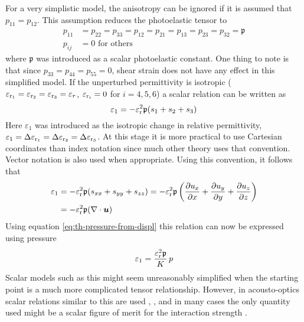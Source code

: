 \documentclass[11pt,twoside]{eitExjobb}
\begin{document}
	For a very simplistic model, the anisotropy can be ignored if it is assumed that $p_{11} = p_{12}$. This assumption reduces the photoelastic tensor to
	\begin{equation*}
	\begin{split}
		p_{11} &= p_{22} = p_{33} = p_{12} = p_{21} = p_{13} = p_{23} = p_{32} = \mathfrak{p}\\
		p_{ij} &= 0 \text{ for others}
	\end{split}
	\end{equation*}
	where $\mathfrak{p}$ was introduced as a scalar photoelastic constant. One thing to note is that since $p_{33} = p_{44} = p_{55} = 0$, shear strain does not have any effect in this simplified model. If the unperturbed permittivity is isotropic ($\varepsilon_{\mathrm{r}_1} = \varepsilon_{\mathrm{r}_2} = \varepsilon_{\mathrm{r}_3} = \varepsilon_r$, $\varepsilon_{\mathrm{r}_i} = 0$ for $i=4,5,6$) a scalar relation can be written as
	\begin{equation*}
		\varepsilon_1 = -\varepsilon_{\mathrm{r}}^2 \mathfrak{p} (s_1 + s_2 + s_3)
	\end{equation*}
	Here $\varepsilon_1$ was introduced as the isotropic change in relative permittivity, $\varepsilon_1 = \Delta \varepsilon_{\mathrm{r}_1} = \Delta \varepsilon_{\mathrm{r}_2} = \Delta \varepsilon_{\mathrm{r}_3}$. At this stage it is more practical to use Cartesian coordinates than index notation since much other theory uses that convention. Vector notation is also used when appropriate. Using this convention, it follows that
	\begin{equation}
	\begin{split}
		\varepsilon_1 &= -\varepsilon_{\mathrm{r}}^2 \mathfrak{p} (s_{xx} + s_{yy} + s_{zz}) = -\varepsilon_{\mathrm{r}}^2 \mathfrak{p} \left( \frac{\partial u_x}{\partial x} + \frac{\partial u_y}{\partial y} + \frac{\partial u_z}{\partial z} \right) \\
		&= -\varepsilon_{\mathrm{r}}^2 \mathfrak{p} (\nabla \cdot \bm{u})
	\end{split}
	\label{eq:th-PE-scalar}
	\end{equation}
	Using equation \eqref{eq:th-pressure-from-displ} this relation can now be expressed using pressure
	\begin{equation}
		\varepsilon_1 = \frac{\varepsilon_{\mathrm{r}}^2 \mathfrak{p}}{K} \,p
		\label{eq:th-PE-scalar-p}
	\end{equation}
	Scalar models such as this might seem unreasonably simplified when the starting point is a much more complicated tensor relationship. However, in acousto-optics scalar relations similar to this are used  \cite{Saleh2007}, \cite{Korpel1988}, and in many cases the only quantity used might be a scalar figure of merit for the interaction strength \cite{Korpel1988}.
	
\end{document}
